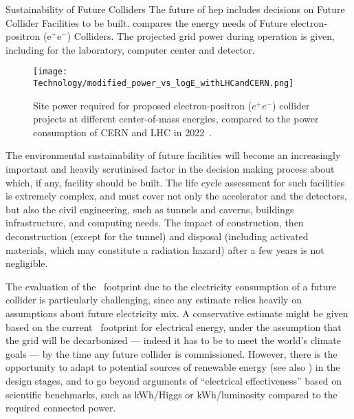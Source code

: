 \documentclass[../SustainableHEP.tex]{subfiles}
\begin{document}


\begin{casestudy}{Sustainability of Future Colliders}%
\noindent The future of \acrshort{hep} includes decisions on Future Collider Facilities to be built.  compares the energy needs of Future electron-positron (e$^+$e$^-$) Colliders. The projected grid power during operation is given, including for the laboratory, computer center and detector.

\begin{figure}
    \captionsetup{type=figure}
    {\texttt{[image: Technology/modified\_power\_vs\_logE\_withLHCandCERN.png]}}
    \caption[Site power required for proposed $e^+e^-$ colliders]{Site power required for proposed electron-positron ($e^+e^-$) collider projects at different center-of-mass energies, compared to the power consumption of CERN and LHC in 2022~\cite{privateJList}. }\label{fig:powerCollider}
\end{figure}

The environmental sustainability of future facilities will become an increasingly important and heavily scrutinised factor in the decision making process about which, if any, facility should be built. The life cycle assessment for such facilities is extremely complex, and must cover not only the accelerator and the detectors, but also the civil engineering, such as tunnels and caverns, buildings infrastructure, and computing needs. The impact of construction, then deconstruction (except for the tunnel) and disposal (including activated materials, which may constitute a radiation hazard) after a few years is not negligible.

The evaluation of the \CdO\ footprint due to the electricity consumption of a future collider is particularly challenging, since any estimate relies heavily on assumptions about future electricity mix. A conservative estimate might be given based on the current \CdO\ footprint for electrical energy, under the assumption that the grid will be decarbonised --- indeed it has to be to meet the world's climate goals --- by the time any future collider is commissioned. However, there is the opportunity to adapt to potential sources of renewable energy (see also ) in the design stages, and to go beyond arguments of ``electrical effectiveness'' based on scientific benchmarks, such as kWh/Higgs or kWh/luminosity compared to the required connected power.
\end{casestudy}
\end{document}
